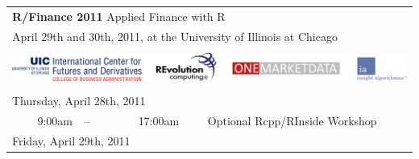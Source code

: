 \documentclass[11pt]{article}
\newcommand{\ra}[1]{\renewcommand{\arraystretch}{#1}}  %
\newcommand{\mylinecolor}[1]{\color{#1}\vspace{-8pt}}  %
\begin{document}
\thispagestyle{empty}


\ra{1.05} \sf

\begin{tabular}{rlrlp{5in}} %

  \multicolumn{5}{l}{\Huge \textbf{\color{KeynoteTalk} R/Finance 2011} \huge \phantom{i} Applied Finance with R} \\
  \multicolumn{5}{l}{\large \color{Breaks} April 29th and 30th, 2011, at the University of Illinois at Chicago} \\[3pt]

  \bottomrule \\

  \multicolumn{5}{l}{
    \centering
    \includegraphics[page=1,scale=0.15]{alllogos.pdf}
  } \\[5pt]

  \bottomrule \\[3pt]

  \multicolumn{5}{l}{\large Thursday, April 28th, 2011} \\
  9:00am & -- & 17:00am &   & \small{\mylinecolor{Breaks} Optional Rcpp/RInside Workshop} \\[12pt]

  \multicolumn{5}{l}{\large Friday, April 29th, 2011} \\


\end{tabular}
\end{document}
